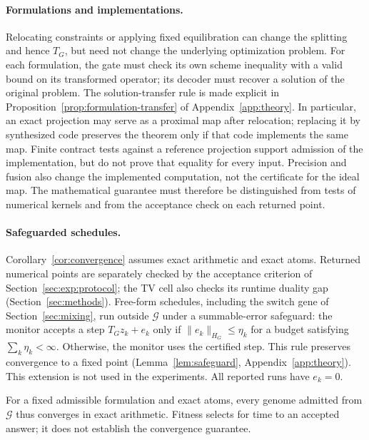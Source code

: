 \paragraph{Formulations and implementations.}
Relocating constraints or applying fixed equilibration can change the
splitting and hence $T_G$, but need not change the underlying optimization
problem. For each formulation, the gate must check its own scheme inequality
with a valid bound on its transformed operator; its decoder must recover a
solution of the original problem. The solution-transfer rule is made explicit
in Proposition~\ref{prop:formulation-transfer} of Appendix~\ref{app:theory}.
In particular, an exact projection may serve as a proximal map after
relocation; replacing it by synthesized code preserves the theorem only if
that code implements the same map. Finite contract tests against a reference
projection support admission of the implementation, but do not prove that
equality for every input. Precision and fusion also change the implemented
computation, not the certificate for the ideal map. The mathematical guarantee
must therefore be distinguished from tests of numerical kernels and from the
acceptance check on each returned point.

\paragraph{Safeguarded schedules.}
Corollary~\ref{cor:convergence} assumes exact arithmetic and exact atoms.
Returned numerical points are separately checked by the acceptance criterion
of Section~\ref{sec:exp:protocol}; the TV cell also checks its runtime duality
gap (Section~\ref{sec:methods}). Free-form
schedules, including the $\mathrm{switch}$ gene of Section~\ref{sec:mixing},
run outside $\mathcal G$ under a summable-error safeguard: the
monitor accepts a step $T_Gz_k+e_k$ only if $\|e_k\|_{H_G}\leq\eta_k$ for a
budget satisfying $\sum_k\eta_k<\infty$. Otherwise, the monitor uses the
certified step. This rule preserves convergence to a fixed point
(Lemma~\ref{lem:safeguard}, Appendix~\ref{app:theory}). This extension is not
used in the experiments. All reported runs have $e_k=0$.

For a fixed admissible formulation and exact atoms, every genome admitted
from $\mathcal G$ thus converges in exact arithmetic. Fitness selects for
time to an accepted answer; it does not establish the convergence guarantee.


